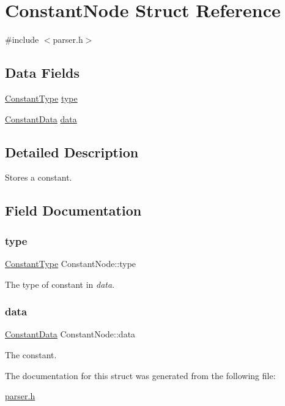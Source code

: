 \hypertarget{struct_constant_node}{}\section{Constant\+Node Struct Reference}
\label{struct_constant_node}


{\ttfamily \#include $<$parser.\+h$>$}

\subsection*{Data Fields}
\begin{DoxyCompactItemize}
\item 
\hyperlink{parser_8h_a455cdd942ce73c87e99cb3f9d6a01926}{Constant\+Type} \hyperlink{struct_constant_node_ae0c5b58398f2ff9a476628ea34858893}{type}
\item 
\hyperlink{union_constant_data}{Constant\+Data} \hyperlink{struct_constant_node_ae546bb49962906e06a965381014ea7ae}{data}
\end{DoxyCompactItemize}


\subsection{Detailed Description}
Stores a constant. 

\subsection{Field Documentation}
\mbox{\label{struct_constant_node_ae0c5b58398f2ff9a476628ea34858893}} 
\subsubsection{\texorpdfstring{type}{type}}
{\footnotesize\ttfamily \hyperlink{parser_8h_a455cdd942ce73c87e99cb3f9d6a01926}{Constant\+Type} Constant\+Node\+::type}

The type of constant in {\itshape data}. \mbox{\label{struct_constant_node_ae546bb49962906e06a965381014ea7ae}} 
\subsubsection{\texorpdfstring{data}{data}}
{\footnotesize\ttfamily \hyperlink{union_constant_data}{Constant\+Data} Constant\+Node\+::data}

The constant. 

The documentation for this struct was generated from the following file\+:\begin{DoxyCompactItemize}
\item 
\hyperlink{parser_8h}{parser.\+h}\end{DoxyCompactItemize}

